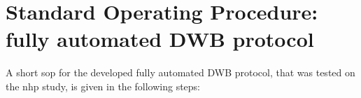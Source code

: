 %

\section*{Standard Operating Procedure: fully automated DWB protocol}
A short \gls{sop} for the developed fully automated DWB protocol, that was tested on the \gls{nhp} study, is given in the following steps:

